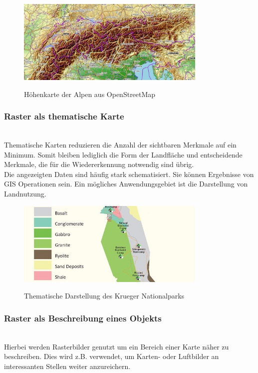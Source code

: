 \documentclass[10pt,conference,compsocconf]{IEEEtran}
\begin{document}
\begin{figure}[H]
  \centering
  	\includegraphics[height=114pt]{img/gis_alps}\\
  \caption[]{Höhenkarte der Alpen aus OpenStreetMap}
  \label{img:gis_alps}
\end{figure}

\subsubsection{Raster als thematische Karte}\hspace*{\fill} \\
Thematische Karten reduzieren die Anzahl der sichtbaren Merkmale auf ein Minimum. Somit bleiben lediglich die Form der Landfläche und entscheidende Merkmale, die für die Wiedererkennung notwendig sind übrig.\\
Die angezeigten Daten sind häufig stark schematisiert. Sie können Ergebnisse von GIS Operationen sein. Ein mögliches Anwendungsgebiet ist die Darstellung von Landnutzung. 

\begin{figure}[H]
  \centering
  	\includegraphics[height=114pt]{img/gis_thematisch}\\
  \caption[]{Thematische Darstellung des Krueger Nationalparks\footnotemark}
  \label{img:gis_thematisch}
\end{figure}

\subsubsection{Raster als Beschreibung eines Objekts}\hspace*{\fill} \\
Hierbei werden Rasterbilder genutzt um ein Bereich einer Karte näher zu beschreiben. Dies wird z.B. verwendet, um Karten- oder Luftbilder an interessanten Stellen weiter anzureichern. 
\end{document}
